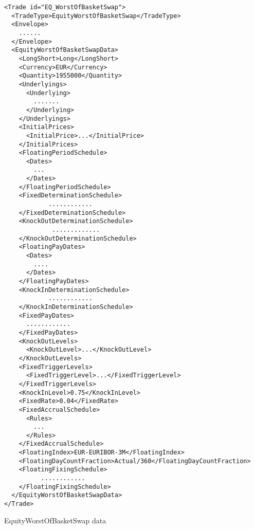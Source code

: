 \begin{listing}[H]
\begin{verbatim}
<Trade id="EQ_WorstOfBasketSwap">
  <TradeType>EquityWorstOfBasketSwap</TradeType>
  <Envelope>
    ......
  </Envelope>
  <EquityWorstOfBasketSwapData>
    <LongShort>Long</LongShort>
    <Currency>EUR</Currency>
    <Quantity>1955000</Quantity>
    <Underlyings>
      <Underlying>
        .......
      </Underlying>
    </Underlyings>
    <InitialPrices>
      <InitialPrice>...</InitialPrice>
    </InitialPrices>
    <FloatingPeriodSchedule>
      <Dates>
        ...
      </Dates>
    </FloatingPeriodSchedule>
    <FixedDeterminationSchedule>
            ............
    </FixedDeterminationSchedule>
    <KnockOutDeterminationSchedule>
             .............
    </KnockOutDeterminationSchedule>
    <FloatingPayDates>
      <Dates>
        ....
      </Dates>
    </FloatingPayDates>
    <KnockInDeterminationSchedule>
            ............
    </KnockInDeterminationSchedule>
    <FixedPayDates>
      ............
    </FixedPayDates>
    <KnockOutLevels>
      <KnockOutLevel>...</KnockOutLevel>
    </KnockOutLevels>
    <FixedTriggerLevels>
      <FixedTriggerLevel>...</FixedTriggerLevel>
    </FixedTriggerLevels>
    <KnockInLevel>0.75</KnockInLevel>
    <FixedRate>0.04</FixedRate>
    <FixedAccrualSchedule>
      <Rules>
        ...
      </Rules>
    </FixedAccrualSchedule>
    <FloatingIndex>EUR-EURIBOR-3M</FloatingIndex>
    <FloatingDayCountFraction>Actual/360</FloatingDayCountFraction>
    <FloatingFixingSchedule>
          ............
    </FloatingFixingSchedule>
  </EquityWorstOfBasketSwapData>
</Trade>
\end{verbatim}
\caption{EquityWorstOfBasketSwap data}
\label{lst:eqworstofbasketswap_data}
\end{listing}

